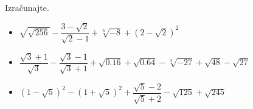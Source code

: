         
            \begin{naloga}
                Izračunajte.
                \begin{itemize}
                        \item $\sqrt{\sqrt{256}}-\dfrac{3-\sqrt{2}}{\sqrt{2}-1}+\sqrt[3]{-8}+\left(2-\sqrt{2}\right)^2$ 
                        \item $\dfrac{\sqrt{3}+1}{\sqrt{3}}-\dfrac{\sqrt{3}-1}{\sqrt{3}+1}+\sqrt{0.16}+\sqrt{0.64}-\sqrt[3]{-27}+\sqrt{48}-\sqrt{27}$ 
                        \item $\left(1-\sqrt{5}\right)^2-\left(1+\sqrt{5}\right)^2+\dfrac{\sqrt{5}-2}{\sqrt{5}+2}-\sqrt{125}+\sqrt{245}$ 
                \end{itemize}
            \end{naloga}
        




